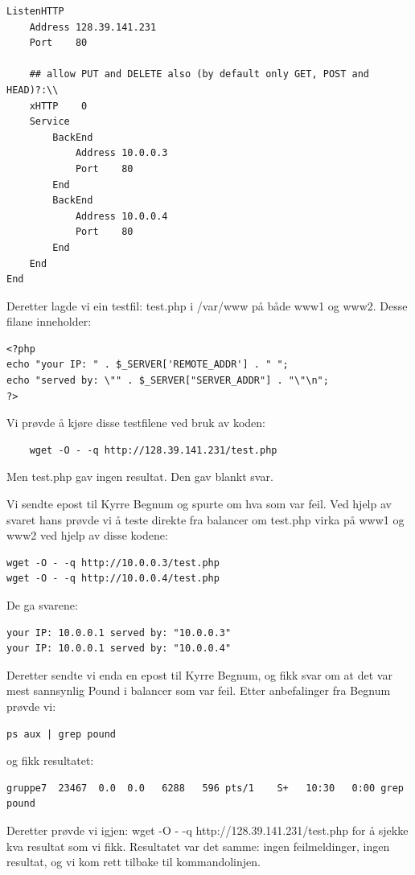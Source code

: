 \documentclass[a4paper, norsk, 12pt]{article}
\begin{document}
\begin{verbatim}
ListenHTTP
    Address 128.39.141.231
    Port    80

    ## allow PUT and DELETE also (by default only GET, POST and HEAD)?:\\
    xHTTP    0
    Service
        BackEnd
            Address 10.0.0.3
            Port    80
        End
        BackEnd
            Address 10.0.0.4
            Port    80
        End
    End
End
\end{verbatim}

Deretter lagde vi ein testfil: test.php i /var/www på både www1 og www2. Desse filane inneholder:
\begin{verbatim} 
<?php
echo "your IP: " . $_SERVER['REMOTE_ADDR'] . " ";
echo "served by: \"" . $_SERVER["SERVER_ADDR"] . "\"\n";
?>
\end{verbatim}

Vi prøvde å kjøre disse testfilene ved bruk av koden:
\begin{verbatim}
	wget -O - -q http://128.39.141.231/test.php 
\end{verbatim}
Men test.php gav ingen resultat. Den gav blankt svar.

Vi sendte epost til Kyrre Begnum og spurte om hva som var feil. Ved hjelp av svaret hans prøvde vi å teste direkte fra balancer om test.php virka på www1 og www2 ved hjelp av disse kodene:
\begin{verbatim}
wget -O - -q http://10.0.0.3/test.php
wget -O - -q http://10.0.0.4/test.php
\end{verbatim}

De ga svarene:
\begin{verbatim}
your IP: 10.0.0.1 served by: "10.0.0.3"
your IP: 10.0.0.1 served by: "10.0.0.4"
\end{verbatim}

Deretter sendte vi enda en epost til Kyrre Begnum, og fikk svar om at det var mest sannsynlig Pound i balancer som var feil. Etter anbefalinger fra Begnum prøvde vi:
\begin{verbatim}
ps aux | grep pound 
\end{verbatim}
og fikk resultatet:
\begin{verbatim}
gruppe7  23467  0.0  0.0   6288   596 pts/1    S+   10:30   0:00 grep pound
\end{verbatim}

Deretter prøvde vi igjen: wget -O - -q http://128.39.141.231/test.php for å sjekke kva resultat som vi fikk. Resultatet var det samme: ingen feilmeldinger, ingen resultat, og vi kom rett tilbake til kommandolinjen.
\end{document}
